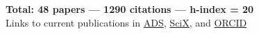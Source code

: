 \documentclass[11pt]{article}
\newcommand{\totalcitations}{{\bf Total: 48 papers --- 1290 citations --- h-index = 20}}
\newcommand{\adspublink}{\href{https://ui.adsabs.harvard.edu/public-libraries/y09ZmJBWTfCs0q5KMVKSwQ}{ADS}}
\newcommand{\scixpublink}{\href{https://scixplorer.org/public-libraries/y09ZmJBWTfCs0q5KMVKSwQ}{SciX}}
\newcommand{\orcidlink}{\href{https://orcid.org/my-orcid?orcid=0000-0003-2508-2586}{ORCID}}
\begin{document}
\totalcitations\\
Links to current publications in \adspublink, \scixpublink, and \orcidlink

\begingroup
\let\clearpage\relax

\renewcommand{\bibsection}{}
{}

\nocite{*}
\endgroup

\end{document}
